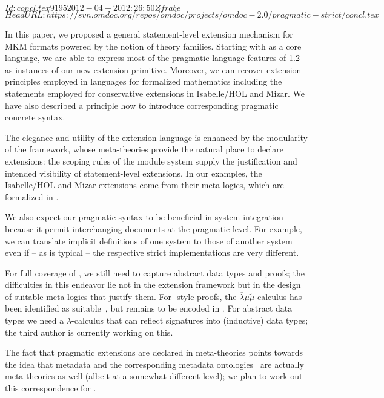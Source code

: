 \svnInfo $Id: concl.tex 9195 2012-04-20 12:26:50Z frabe $
\svnKeyword $HeadURL:
https://svn.omdoc.org/repos/omdoc/projects/omdoc-2.0/pragmatic-strict/concl.tex $

  In this paper, we proposed a general statement-level extension mechanism for MKM formats
  powered by the notion of theory families.  Starting with {\mmt} as a core language, we
  are able to express most of the pragmatic language features of {\omdoc} 1.2 as instances
  of our new extension primitive.  Moreover, we can recover extension principles employed
  in languages for formalized mathematics including the statements employed for
  conservative extensions in Isabelle/HOL and Mizar. We have also described a principle
  how to introduce corresponding pragmatic concrete syntax.

  The elegance and utility of the extension language is enhanced by the modularity of the
   framework, whose meta-theories provide the natural place to declare extensions:
  the scoping rules of the {\mmt} module system supply the justification and intended
  visibility of statement-level extensions. In our examples, the Isabelle/HOL and Mizar
  extensions come from their meta-logics, which are formalized in {\mmt}.

We also expect our pragmatic syntax to be beneficial in system integration because it permit interchanging documents at the pragmatic {\mmt} level. For example, we can translate implicit definitions of one system to those of another system even if -- as is typical -- the respective strict implementations are very different.
  
  For full coverage of , we still need to
  capture abstract data types and proofs; the difficulties in this endeavor lie not in the
  extension framework but in the design of suitable meta-logics that justify them.
  For
  \omdoc-style proofs, the $\overline\lambda\mu\tilde\mu$-calculus has been identified as suitable~\cite{AutSac:fcboapl06}, but remains to be encoded in
  \mmt. For abstract data types we need a $\lambda$-calculus that can reflect signatures
  into (inductive) data types; the third author is currently working on this.

  The fact that pragmatic extensions are declared in meta-theories points towards the idea that {\omdoc}
  metadata and the corresponding metadata ontologies~\cite{LK:MathOntoAuthDoc09} are
  actually meta-theories as well (albeit at a somewhat different level); we plan to work
  out this correspondence for .

